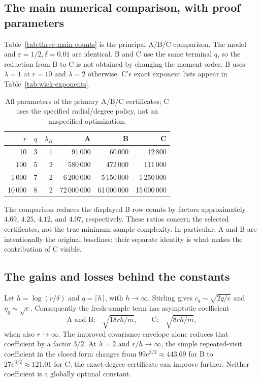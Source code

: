 \documentclass[11pt]{article}
\numberwithin{equation}{section}
\theoremstyle{definition}\newtheorem{definition}[theorem]{Definition}
\theoremstyle{remark}\newtheorem{remark}[theorem]{Remark}
\begin{document}
\subsection{The main numerical comparison, with proof parameters}
Table~\ref{tab:three-main-counts} is the principal A/B/C comparison.
The model and $\varepsilon=1/2,\delta=0.01$ are identical. B and C use the same
terminal $q$, so the reduction from B to C is not obtained by changing the
moment order. B uses $\lambda=1$ at $r=10$ and $\lambda=2$ otherwise.
C's exact exponent lists appear in Table~\ref{tab:wick-exponents}.

\begin{table}[H]\centering\small
\setlength{\tabcolsep}{7pt}\renewcommand{\arraystretch}{1.2}
\begin{tabular}{@{}rrrrrr@{}}
\toprule
$r$&$q$&$\lambda_B$&\textbf{A}&\textbf{B}&\textbf{C}\\
\midrule
10&3&1&91\,000&60\,000&12\,800\\
100&5&2&580\,000&472\,000&111\,000\\
1\,000&7&2&6\,200\,000&5\,150\,000&1\,250\,000\\
10\,000&8&2&72\,000\,000&61\,000\,000&15\,000\,000\\
\bottomrule
\end{tabular}
\caption{All parameters of the primary A/B/C certificates; C uses the
specified radial/degree policy, not an unspecified optimization.}
\label{tab:main-parameters}
\end{table}

The comparison reduces the displayed B row counts by factors approximately
$4.69$, $4.25$, $4.12$, and $4.07$, respectively. These ratios concern the
selected certificates, not the true minimum sample complexity. In particular,
A and B are intentionally the original baselines: their separate identity is
what makes the contribution of C visible.

\subsection{The gains and losses behind the constants}
Let $h=\log(r/\delta)$ and $q=\lceil h\rceil$, with $h\to\infty$.
Stirling gives $c_q\sim\sqrt{2q/e}$ and $\eta_q\sim\sqrt e$.
Consequently the fresh-sample term has asymptotic coefficient
\[
 \text{A and B:}\quad\sqrt{18rh/m},\qquad
 \text{C:}\quad\sqrt{8rh/m},
\]
when also $r\to\infty$. The improved covariance envelope alone reduces
that coefficient by a factor $3/2$.
At $\lambda=2$ and $r/h\to\infty$, the simple repeated-visit coefficient
in the closed form changes from $99e^{3/2}\approx443.69$ for B to
$27e^{3/2}\approx121.01$ for C; the exact-degree certificate can improve
further. Neither coefficient is a globally optimal constant.
\end{document}
